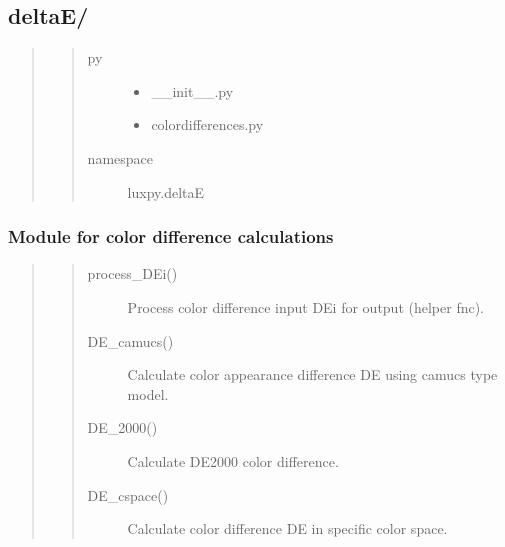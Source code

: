 \documentclass[letterpaper,10pt,english]{sphinxmanual}
\begin{document}
\subsection{deltaE/}
\label{\detokenize{color:deltae}}\begin{quote}
\begin{quote}\begin{description}
\item[{py}] \leavevmode\begin{itemize}
\item {} 
\_\_init\_\_.py

\item {} 
colordifferences.py

\end{itemize}

\item[{namespace}] \leavevmode
luxpy.deltaE

\end{description}\end{quote}
\end{quote}
\label{\detokenize{color:module-luxpy.color.deltaE}}

\subsubsection{Module for color difference calculations}
\label{\detokenize{color:module-for-color-difference-calculations}}\begin{quote}
\begin{quote}\begin{description}
\item[{process\_DEi()}] \leavevmode
Process color difference input DEi for output (helper fnc).

\item[{DE\_camucs()}] \leavevmode
Calculate color appearance difference DE using camucs type model.

\item[{DE\_2000()}] \leavevmode
Calculate DE2000 color difference.

\item[{DE\_cspace()}] \leavevmode
Calculate color difference DE in specific color space.

\end{description}\end{quote}
\end{quote}
\end{document}
